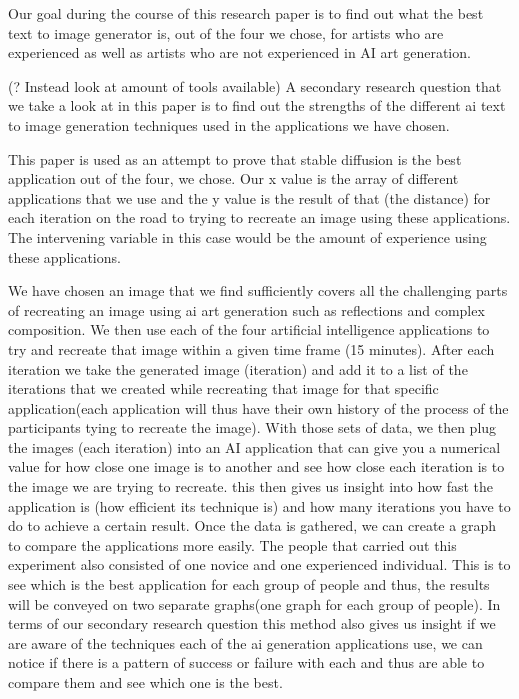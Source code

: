 \documentclass[]{report}
\begin{document}
	Our goal during the course of this research paper is to find out what the best text to image generator is, out of the four we chose, for artists who are experienced as well as artists who are not experienced in AI art generation.
	
	(? Instead look at amount of tools available) A secondary research question that we take a look at in this paper is to find out the strengths of the different ai text to image generation techniques used in the applications we have chosen.
	
	This paper is used as an attempt to prove that stable diffusion is the best application out of the four, we chose. Our x value is the array of different applications that we use and the y value is the result of that (the distance) for each iteration on the road to trying to recreate an image using these applications. The intervening variable in this case would be the amount of experience using these applications.
	
	We have chosen an image that we find sufficiently covers all the challenging parts of recreating an image using ai art generation such as reflections and complex composition. We then use each of the four artificial intelligence applications to try and recreate that image within a given time frame (15 minutes). After each iteration we take the generated image (iteration) and add it to a list of the iterations that we created while recreating that image for that specific application(each application will thus have their own history of the process of the participants tying to recreate the image). With those sets of data, we then plug the images (each iteration) into an AI application that can give you a numerical value for how close one image is to another and see how close each iteration is to the image we are trying to recreate. this then gives us insight into how fast the application is (how efficient its technique is) and how many iterations you have to do to achieve a certain result. Once the data is gathered, we can create a graph to compare the applications more easily. The people that carried out this experiment also consisted of one novice and one experienced individual. This is to see which is the best application for each group of people and thus, the results will be conveyed on two separate graphs(one graph for each group of people). In terms of our secondary research question this method also gives us insight if we are aware of the techniques each of the ai generation applications use, we can notice if there is a pattern of success or failure with each and thus are able to compare them and see which one is the best.
	
\end{document}
